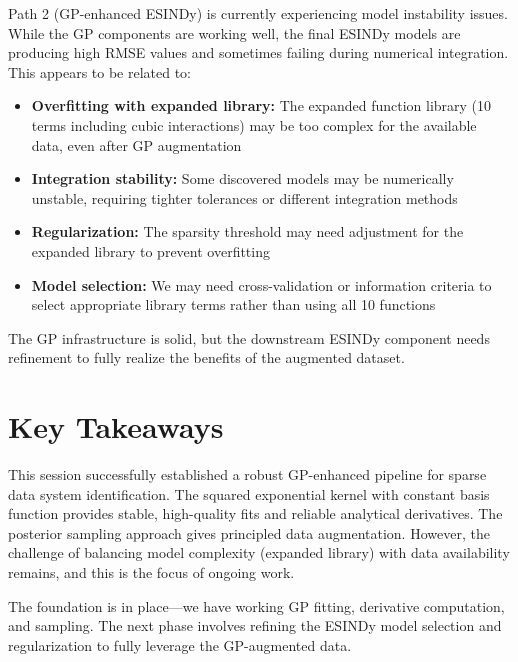 \documentclass[11pt]{article}
\begin{document}
Path 2 (GP-enhanced ESINDy) is currently experiencing model instability issues. While the GP components are working well, the final ESINDy models are producing high RMSE values and sometimes failing during numerical integration. This appears to be related to:

\begin{itemize}
    \item \textbf{Overfitting with expanded library:} The expanded function library (10 terms including cubic interactions) may be too complex for the available data, even after GP augmentation
    \item \textbf{Integration stability:} Some discovered models may be numerically unstable, requiring tighter tolerances or different integration methods
    \item \textbf{Regularization:} The sparsity threshold may need adjustment for the expanded library to prevent overfitting
    \item \textbf{Model selection:} We may need cross-validation or information criteria to select appropriate library terms rather than using all 10 functions
\end{itemize}

The GP infrastructure is solid, but the downstream ESINDy component needs refinement to fully realize the benefits of the augmented dataset.

\section{Key Takeaways}

This session successfully established a robust GP-enhanced pipeline for sparse data system identification. The squared exponential kernel with constant basis function provides stable, high-quality fits and reliable analytical derivatives. The posterior sampling approach gives principled data augmentation. However, the challenge of balancing model complexity (expanded library) with data availability remains, and this is the focus of ongoing work.

The foundation is in place---we have working GP fitting, derivative computation, and sampling. The next phase involves refining the ESINDy model selection and regularization to fully leverage the GP-augmented data.
\end{document}
